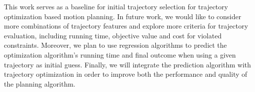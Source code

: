 \documentclass[letterpaper, 10 pt, conference]{ieeeconf}  %
\begin{document}
This work serves as a baseline for initial trajectory selection for trajectory optimization based motion planning. In future work, we would like to consider more combinations of trajectory features and explore more criteria for trajectory evaluation, including running time, objective value and cost for violated constraints. Moreover, we plan to use regression algorithms to predict the optimization algorithm's running time and final outcome when using a given trajectory as initial guess. Finally, we will integrate the prediction algorithm with trajectory optimization in order to improve both the performance and quality of the planning algorithm.




\end{document}
